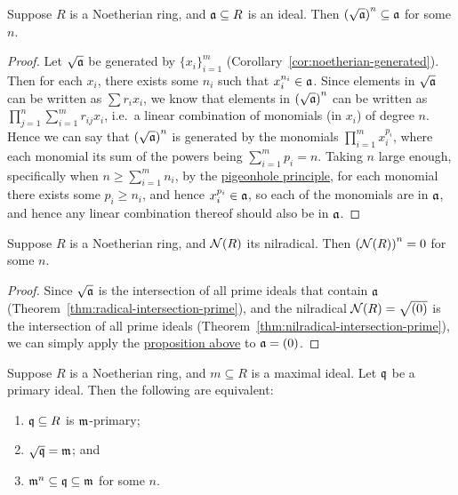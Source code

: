 \begin{proposition}\label{prop:ideal-power-radical-inclusion}
    Suppose \(R\) is a Noetherian ring, and \(\mathfrak{a} \subseteq R\) is an ideal.
    Then \({(\sqrt{\mathfrak{a}})}^n \subseteq \mathfrak{a}\) for some \(n\).
\end{proposition}
\begin{proof}
    Let \(\sqrt{\mathfrak{a}}\) be generated by \({\{x_i\}}_{i=1}^m\) (Corollary~\ref{cor:noetherian-generated}).
    Then for each \(x_i\), there exists some \(n_i\) such that \(x_i^{n_i} \in \mathfrak{a}\).
    Since elements in \(\sqrt{\mathfrak{a}}\) can be written as \(\sum r_i x_i\),
    we know that elements in \({(\sqrt{\mathfrak{a}})}^n\) can be written as \(\prod_{j=1}^n \sum_{i=1}^m r_{ij} x_i\),
    i.e.\ a linear combination of monomials (in \(x_i\)) of degree \(n\).
    Hence we can say that \({(\sqrt{\mathfrak{a}})}^n\) is generated by the monomials \(\prod_{i=1}^m x_i^{p_i}\),
    where each monomial its sum of the powers being \(\sum_{i=1}^m p_i = n\).
    Taking \(n\) large enough, specifically when \(n \geq \sum_{i=1}^m n_i\),
    by the \hyperref[thm:pigeonhole]{pigeonhole principle},
    for each monomial there exists some \(p_i \geq n_i\), and hence \(x_i^{p_i} \in \mathfrak{a}\),
    so each of the monomials are in \(\mathfrak{a}\), and hence any linear combination thereof should also be in \(\mathfrak{a}\).
\end{proof}
\begin{corollary}
    Suppose \(R\) is a Noetherian ring, and \(\mathcal{N}(R)\) its nilradical.
    Then \({(\mathcal{N}(R))}^n = 0\) for some \(n\).
\end{corollary}
\begin{proof}
    Since \(\sqrt{\mathfrak{a}}\) is the intersection of all prime ideals that contain \(\mathfrak{a}\) (Theorem~\ref{thm:radical-intersection-prime}),
    and the nilradical \(\mathcal{N}(R) = \sqrt{(0)}\) is the intersection of all prime ideals (Theorem~\ref{thm:nilradical-intersection-prime}),
    we can simply apply the \hyperref[prop:ideal-power-radical-inclusion]{proposition above} to \(\mathfrak{a} = (0)\).
\end{proof}
\begin{corollary}
    Suppose \(R\) is a Noetherian ring, and \(m \subseteq R\) is a maximal ideal.
    Let \(\mathfrak{q}\) be a primary ideal.
    Then the following are equivalent:
    \begin{enumerate}[label={(\roman*)}, itemsep=0mm]
        \item \(\mathfrak{q} \subseteq R\) is \(\mathfrak{m}\)-primary;
        \item \(\sqrt{\mathfrak{q}} = \mathfrak{m}\); and
        \item \(\mathfrak{m}^n \subseteq \mathfrak{q} \subseteq \mathfrak{m}\) for some \(n\).
    \end{enumerate}
\end{corollary}
